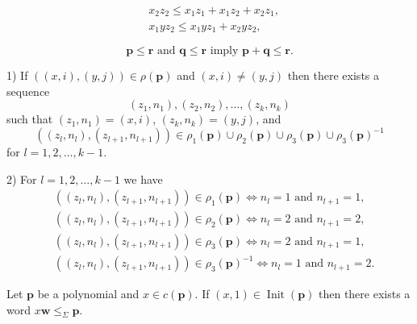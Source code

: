 \documentclass[10pt,a4paper]{amsart}
\DeclareMathOperator{\init}{Init}
\begin{document}
\begin{align}
\label{rook}
&x_2z_2\le x_1z_1+x_1z_2+x_2z_1,\\
\label{crossing}
&x_1yz_2\le x_1yz_1+x_2yz_2,
\end{align}

\begin{equation}
\label{adding inequalities}\mathbf p\le\mathbf r\text{ and }\mathbf q\le\mathbf  r\text{ imply }\mathbf p+\mathbf q\le\mathbf r.
\end{equation}

\begin{lemma}
\label{easy}
\textup{1)} If $((x,i),(y,j))\in\rho(\mathbf p)$ and $(x,i)\neq(y,j)$ then there exists a sequence
\begin{equation}
\label{deduction}(z_1,n_1),(z_2,n_2),\dots,(z_k,n_k)
\end{equation}
such that $(z_1,n_1)=(x,i)$, $(z_k,n_k)=(y,j)$, and
$$((z_l,n_l),(z_{l+1},n_{l+1}))\in\rho_1(\mathbf p)\cup\rho_2(\mathbf p)\cup\rho_3(\mathbf p)\cup\rho_3(\mathbf p)^{-1}$$
for $l=1,2,\dots,k-1$.

\textup{2)} For $l=1,2,\dots,k-1$ we have
\begin{align*}
&((z_l,n_l),(z_{l+1},n_{l+1}))\in\rho_1(\mathbf p)\iff n_l=1\text{ and }n_{l+1}=1,\\
&((z_l,n_l),(z_{l+1},n_{l+1}))\in\rho_2(\mathbf p)\iff n_l=2\text{ and }n_{l+1}=2,\\
&((z_l,n_l),(z_{l+1},n_{l+1}))\in\rho_3(\mathbf p)\iff n_l=2\text{ and }n_{l+1}=1,\\
&((z_l,n_l),(z_{l+1},n_{l+1}))\in\rho_3(\mathbf p)^{-1}\iff n_l=1\text{ and }n_{l+1}=2.
\end{align*}
\end{lemma}

\begin{lemma}
\label{first letters} Let $\mathbf p$ be a polynomial and $x\in c(\mathbf p)$. If $(x,1)\in\init(\mathbf p)$ then there exists a word $x\mathbf w\le_{\Sigma}\mathbf p$.
\end{lemma}
\end{document}
